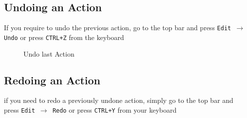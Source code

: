 \documentclass[a4paper]{article}
\begin{document}
\subsection{Undoing an Action} 
If you require to undo the previous action, go to the top bar and press \texttt{Edit $\rightarrow$ Undo} or press \texttt{CTRL+Z} from the keyboard
\begin{figure}[H] \begin{center} 
\label{fig:undo}
\caption{Undo last Action}
\vspace{-20pt}
\end{center} \end{figure} 
\newpage
\subsection{Redoing an Action} 
if you need to redo a previously undone action, simply go to the top bar and press \texttt{Edit $\rightarrow$ Redo} or press \texttt{CTRL+Y} from your keyboard
\end{document}
